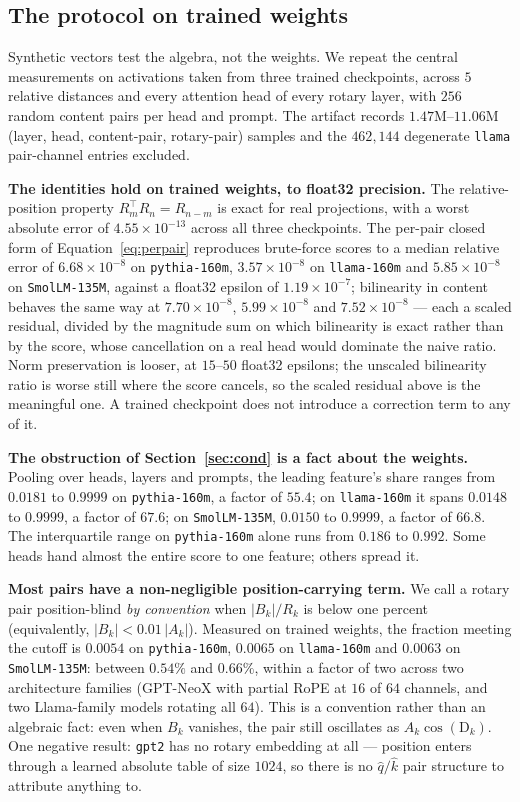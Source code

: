 \documentclass{article}
\theoremstyle{plain}
\theoremstyle{remark}
\newcommand{\R}{R}
\newcommand{\D}{\mathrm{D}_k}
\begin{document}
\subsection{The protocol on trained weights}
\label{app:trained}

Synthetic vectors test the algebra, not the weights. We repeat the central
measurements on activations taken from three trained checkpoints, across $5$
relative distances and every attention head of every rotary layer, with $256$
random content pairs per head and prompt. The artifact records
$1.47$M--$11.06$M (layer, head, content-pair, rotary-pair) samples and the
$462{,}144$ degenerate \texttt{llama} pair-channel entries excluded.

\textbf{The identities hold on trained weights, to float32 precision.} The
relative-position property $\R_m^{\!\top}\R_n = \R_{n-m}$ is exact for real
projections, with a worst absolute error of $4.55\times10^{-13}$ across all three
checkpoints. The per-pair closed form of
Equation~\ref{eq:perpair} reproduces brute-force scores to a median relative
error of $6.68\times10^{-8}$ on \texttt{pythia-160m}, $3.57\times10^{-8}$ on
\texttt{llama-160m} and $5.85\times10^{-8}$ on \texttt{SmolLM-135M}, against a
float32 epsilon of $1.19\times10^{-7}$; bilinearity in content behaves the same
way at $7.70\times10^{-8}$, $5.99\times10^{-8}$ and $7.52\times10^{-8}$ --- each
a scaled residual, divided by the magnitude sum on which bilinearity is exact
rather than by the score, whose cancellation on a real head would dominate the
naive ratio. Norm preservation is looser, at $15$--$50$ float32 epsilons; the
unscaled bilinearity ratio is worse still where the score cancels, so the scaled
residual above is the meaningful one. A trained checkpoint does not introduce a
correction term to any of it.

\textbf{The obstruction of Section~\ref{sec:cond} is a fact about the weights.}
Pooling over heads, layers and prompts, the leading feature's share ranges from
$0.0181$ to $0.9999$ on \texttt{pythia-160m}, a factor of $55.4$; on
\texttt{llama-160m} it spans $0.0148$ to $0.9999$, a factor of $67.6$; on
\texttt{SmolLM-135M}, $0.0150$ to $0.9999$, a factor of $66.8$. The interquartile
range on \texttt{pythia-160m} alone runs from $0.186$ to $0.992$. Some heads hand
almost the entire score to one feature; others spread it.

\textbf{Most pairs have a non-negligible position-carrying term.} We call a
rotary pair position-blind \emph{by convention} when $|B_k|/R_k$ is below one
percent (equivalently, $|B_k| < 0.01\,|A_k|$). Measured on trained weights, the
fraction meeting the cutoff is $0.0054$ on \texttt{pythia-160m}, $0.0065$ on
\texttt{llama-160m} and $0.0063$ on \texttt{SmolLM-135M}: between $0.54\%$ and
$0.66\%$, within a factor of two across two architecture families (GPT-NeoX with
partial RoPE at $16$ of $64$ channels, and two Llama-family models rotating all
$64$). This is a convention rather than an algebraic fact: even when $B_k$
vanishes, the pair still oscillates as $A_k\cos(\D)$. One negative result:
\texttt{gpt2} has no rotary embedding at all ---
position enters through a learned absolute table of size $1024$, so there is no
$\hat q/\hat k$ pair structure to attribute anything to.
\end{document}
